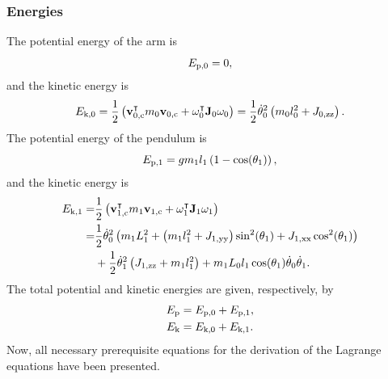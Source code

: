 \subsubsection{Energies}
The potential energy of the arm is
\begin{equation}
	E _{\text{p,0}} = 0,
\end{equation}
and the kinetic energy is
\begin{equation}
	E _{\text{k,0}} = \frac{1}{2}\left( \text{\textbf{v}}_{0,\text{c}}^\intercal m_0\textbf{v}_{0,\text{c}} + \omega_0^\intercal \text{\textbf{J}}_0\omega_0  \right) = 
	\frac{1}{2}\dot{\theta}_0^2\left(  m_0l_0^2+J_{0,\text{zz}}  \right).
\end{equation}
The potential energy of the pendulum is
\begin{equation}
E _{\text{p,1}} = gm_1l_1\left( 1-\cos(\theta_1) \right),
\end{equation}
and the kinetic energy is
\begin{equation}
\begin{split}
	E _{\text{k,1}} = &\frac{1}{2}\left( \text{\textbf{v}}_{1,\text{c}}^\intercal m_1\textbf{v}_{1,\text{c}} + \omega_1^\intercal \text{\textbf{J}}_1\omega_1  \right)\\
	= &\frac{1}{2}\dot{\theta}_0^2\left( m_1L_1^2+\left( m_1l_1^2+J_{1,\text{yy}} \right)\sin^2(\theta_1)+J_{1,\text{xx}}\cos^2(\theta_1) \right)\\
	&+\frac{1}{2}\dot{\theta}_1^2\left(  J_{1,\text{zz}}+m_1l_1^2  \right)+m_1L_0l_1\cos(\theta_1)\dot{\theta}_0\dot{\theta}_1.
\end{split}
\end{equation}
The total potential and kinetic energies are given, respectively, by
\begin{subequations}
	\begin{align}
		E _{\text{p}} &= E _{\text{p,0}} + E _{\text{p,1}}, \\
		E _{\text{k}} &= E _{\text{k,0}} + E _{\text{k,1}}.
	\end{align}
\end{subequations}
Now, all necessary prerequisite equations for the derivation of the Lagrange equations have been presented.
